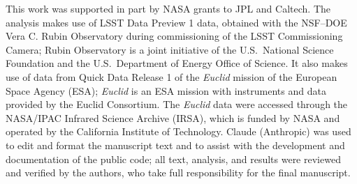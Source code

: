 \documentclass[twocolumn,linenumbers]{aastex701}
\begin{document}
\begin{acknowledgments}
This work was supported in part by NASA grants to JPL and Caltech. The analysis makes use of LSST Data Preview 1 data, obtained with the NSF--DOE Vera C. Rubin Observatory during commissioning of the LSST Commissioning Camera; Rubin Observatory is a joint initiative of the U.S.\ National Science Foundation and the U.S.\ Department of Energy Office of Science. It also makes use of data from Quick Data Release 1 of the \textit{Euclid} mission of the European Space Agency (ESA); \textit{Euclid} is an ESA mission with instruments and data provided by the Euclid Consortium. The \textit{Euclid} data were accessed through the NASA/IPAC Infrared Science Archive (IRSA), which is funded by NASA and operated by the California Institute of Technology. Claude (Anthropic) was used to edit and format the manuscript text and to assist with the development and documentation of the public code; all text, analysis, and results were reviewed and verified by the authors, who take full responsibility for the final manuscript.
\end{acknowledgments}



\end{document}
